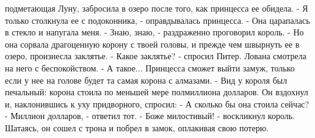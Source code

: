подметающая Луну, забросила в озеро после того, как принцесса ее 
обидела.
    - Я только столкнула ее с подоконника, - оправдывалась принцесса. 
- Она царапалась в стекло и напугала меня.
    - Знаю, знаю, - раздраженно проговорил король. - Но она сорвала 
драгоценную корону с твоей головы, и прежде чем швырнуть ее в озеро, 
произнесла заклятье.
    - Какое заклятье? - спросил Питер. Лована смотрела на него с 
беспокойством.
    - А такое... Принцесса сможет выйти замуж, только если у нее на 
голове будет та самая корона с алмазами. - Вид у короля был печальный: 
корона стоила по меньшей мере полмиллиона долларов. Он вздохнул и, 
наклонившись к уху придворного, спросил: - А сколько бы она стоила 
сейчас?
    - Миллион долларов, - ответил тот.
    - Боже милостивый! - воскликнул король.
    Шатаясь, он сошел с трона и побрел в замок, оплакивая свою потерю.
